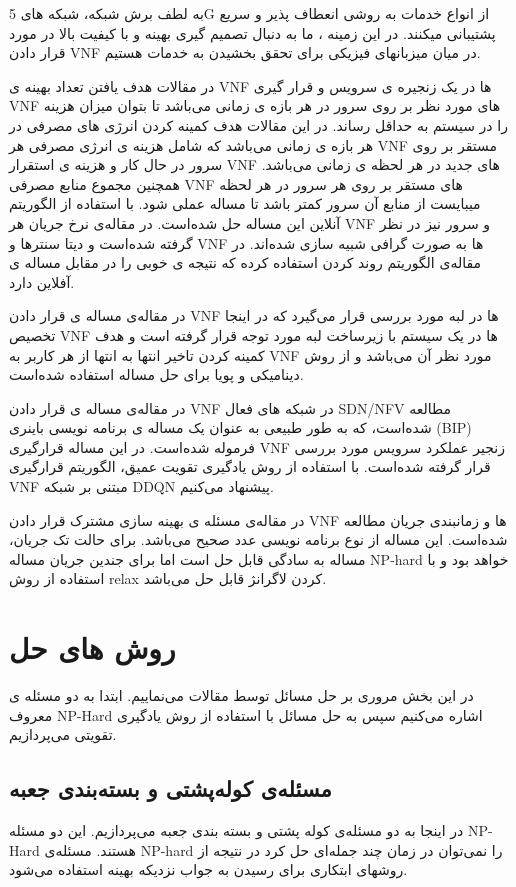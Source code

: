 به لطف برش شبکه، شبکه های 5G از انواع خدمات به روشی انعطاف پذیر و سریع پشتیبانی میکنند. در این زمینه ، ما به دنبال تصمیم گیری بهینه و با کیفیت بالا در مورد قرار دادن VNF در میان میزبانهای فیزیکی برای تحقق بخشیدن به خدمات هستیم.

در مقالات
\cite{wang2016online,jia2018online,luo2020online}
هدف یافتن تعداد بهینه ی VNF ها در یک زنجیره ی سرویس و قرار گیری VNF های مورد نظر بر روی سرور در هر بازه ی زمانی می‌باشد تا بتوان میزان هزینه را در سیستم به حداقل رساند.
در این مقالات هدف کمینه کردن انرژی های مصرفی در هر بازه ی زمانی می‌باشد که شامل هزینه ی انرژی مصرفی هر VNF مستقر بر روی سرور در حال کار و هزینه ی استقرار VNF های جدید در هر لحظه ی زمانی می‌باشد.
همچنین مجموع منابع مصرفی VNF های مستقر بر روی هر سرور در هر لحظه میبایست از منابع آن سرور کمتر باشد تا مساله عملی شود.
با استفاده از الگوریتم آنلاین این مساله حل شده‌است.‌
در مقاله‌ی 
\cite{jia2018online,luo2020online}
نرخ جریان هر VNF و سرور نیز در نظر گرفته شده‌است و دیتا سنترها و VNF ها به صورت گرافی شبیه سازی شده‌اند.
در مقاله‌ی
\cite{luo2020online}
الگوریتم روند کردن استفاده کرده که نتیجه ی خوبی را در مقابل مساله ی آفلاین دارد.

در مقاله‌ی
\cite{cziva2018dynamic}
مساله ی قرار دادن VNF ها در لبه مورد بررسی قرار می‌گیرد که در اینجا تخصیص VNF ها در یک سیستم با زیرساخت لبه مورد توجه قرار گرفته است و هدف کمینه کردن تاخیر انتها به انتها از هر کاربر به VNF مورد نظر آن می‌باشد و از روش دینامیکی و پویا برای حل مساله استفاده شده‌است. 

در مقاله‌ی
\cite{pei2019optimal}
مساله ی قرار دادن VNF در شبکه های فعال SDN/NFV مطالعه شده‌است، که به طور طبیعی به عنوان یک مساله ی برنامه نویسی باینری (BIP) فرموله شده‌است. 
در این مساله قرارگیری VNF زنجیر عملکرد سرویس مورد بررسی قرار گرفته شده‌است. 
با استفاده از روش یادگیری تقویت عمیق، الگوریتم قرارگیری VNF مبتنی بر شبکه DDQN  پیشنهاد می‌کنیم.

در مقاله‌ی
\cite{ren2020joint}
 مسئله ی بهینه سازی مشترک قرار دادن VNF ها و زمانبندی جریان مطالعه شده‌است.
 این مساله از نوع برنامه نویسی عدد صحیح می‌باشد.
 برای حالت تک جریان، مساله به سادگی قابل حل است اما برای جندین جریان مساله
 NP-hard
 خواهد بود و با استفاده از روش relax کردن لاگرانژ
 قابل حل می‌باشد.
\section{روش های حل}
در این بخش مروری بر حل مسائل توسط مقالات می‌نماییم. 
ابتدا به دو مسئله ی معروف NP-Hard
اشاره می‌کنیم سپس به حل مسائل با استفاده از روش یادگیری تقویتی می‌پردازیم.
\subsection{مسئله‌ی کوله‌پشتی و بسته‌بندی جعبه}
در اینجا به دو مسئله‌ی کوله پشتی و بسته بندی جعبه می‌پردازیم. این دو مسئله NP-Hard هستند.
مسئله‌ی NP-hard را نمی‌توان در زمان چند جمله‌ای حل کرد در نتیجه از روشهای ابتکاری برای رسیدن به جواب نزدیکه بهینه استفاده می‌شود.
